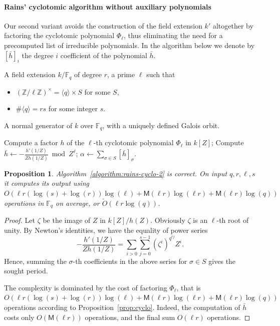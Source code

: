 \documentclass[12pt]{article}
\theoremstyle{plain}
\newtheorem{proposition}[theorem]{Proposition}
\theoremstyle{definition}
\newcommand{\tildO}{\tilde{O}}
\def\Z{\ensuremath{\mathbb{Z}}}
\def\F{\ensuremath{\mathbb{F}}}
\def\MM{\ensuremath{\mathsf{M}}}
\newcounter{algorithm}
\begin{document}
\paragraph{Rains' cyclotomic algorithm without auxiliary polynomials}
Our second variant avoids the construction of the field extension $k'$
altogether by factoring the cyclotomic polynomial $\Phi_\ell$, thus
eliminating the need for a precomputed list of irreducible
polynomials. In the algorithm below we denote by $[\bar{h}]_i$ the
degree $i$ coefficient of the polynomial $\bar{h}$.

\begin{algorithm}
  \label{algorithm:rains-cyclo-2}
  \begin{algorithmic}[1]
    \REQUIRE A field extension $k/\F_q$ of degree $r$, a prime $\ell$ such that
    \begin{itemize}
    \item $(\Z/\ell\Z)^\times = \langle q\rangle \times S$ for some $S$,
    \item $\#\langle q\rangle = rs$ for some integer $s$.
    \end{itemize}
    \ENSURE A normal generator of $k$ over $\F_q$,
    with a uniquely defined Galois orbit.
    
    \STATE Compute a factor $h$ of the $\ell$-th cyclotomic polynomial $\Phi_\ell$ in $k[Z]$; 
    \STATE Compute $\bar{h} \leftarrow -\frac{h'(1/Z)}{Zh(1/Z)} \bmod Z^\ell$;
    \RETURN $\alpha \leftarrow \sum_{\sigma\in S}[\bar{h}]_\sigma$.
  \end{algorithmic}
\end{algorithm}


\begin{proposition}
  Algorithm~\ref{algorithm:rains-cyclo-2} is correct. %
  On input $q,r,\ell,s$ it computes its output using
  $O(\ell r(\log(s)+\log(r))\log(\ell) + \MM(\ell r)\log(\ell r) +
  \MM(\ell r)\log(q))$ operations in $\F_q$ on average, or
  $\tildO(\ell r\log (q))$.
\end{proposition}
\begin{proof}
  Let $\zeta$ be the image of $Z$ in $k[Z]/h(Z)$. Obviously $\zeta$ is
  an $\ell$-th root of unity. By Newton's identities, we have the
  equality of power series
  \begin{equation*}
    -\frac{h'(1/Z)}{Zh(1/Z)} = \sum_{i>0}\sum_{j=0}^{s-1}(\zeta^i)^{q^{rj}} Z^i.
  \end{equation*}
  Hence, summing the $\sigma$-th coefficients in the above series for
  $\sigma\in S$ gives the sought period.

  The complexity is dominated by the cost of factoring $\Phi_\ell$,
  that is
  $O(\ell r(\log(s)+\log(r))\log(\ell) + \MM(\ell r)\log(\ell r) +
  \MM(\ell r)\log(q))$ operations according to
  Proposition~\ref{prop:cyclo}. Indeed, the computation of $\bar{h}$
  costs only $O(\MM(\ell r))$ operations, and the final sum
  $O(\ell r)$ operations.
\end{proof}
\end{document}
